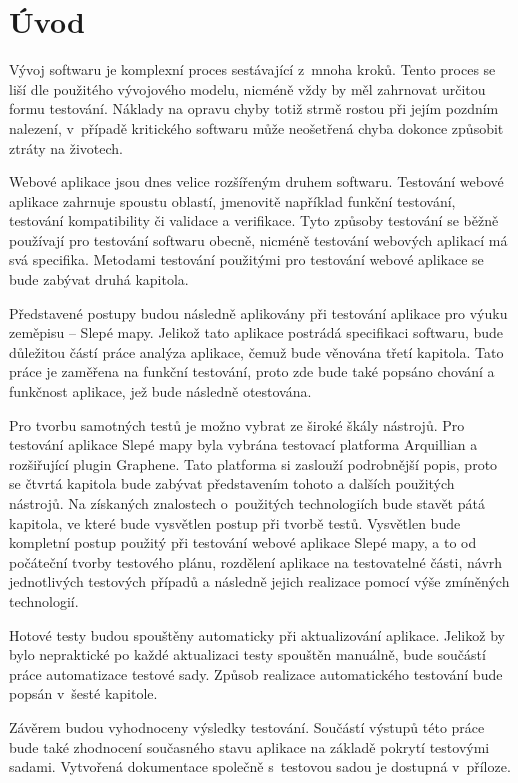 \documentclass[
    color,   %
	table,   %
    twoside, %
]{fithesis3}
\begin{document}
\lstset{language=Java} 
\chapter{Úvod}
Vývoj softwaru je komplexní proces sestávající z~mnoha kroků. Tento proces se liší dle použitého vývojového modelu, nicméně vždy by měl zahrnovat určitou formu testování. Náklady na opravu chyby totiž strmě rostou při jejím pozdním nalezení, v~případě kritického softwaru může neošetřená chyba dokonce způsobit ztráty na životech.

Webové aplikace jsou dnes velice rozšířeným druhem softwaru. Testování webové aplikace zahrnuje spoustu oblastí, jmenovitě například funkční testování, testování kompatibility či validace a verifikace. Tyto způsoby testování se běžně používají pro testování softwaru obecně, nicméně testování webových aplikací má svá specifika. Metodami testování použitými pro testování webové aplikace se bude zabývat druhá kapitola.

Představené postupy budou následně aplikovány při testování aplikace pro výuku zeměpisu – Slepé mapy\cite{SlepeMapy}. Jelikož tato aplikace postrádá specifikaci softwaru, bude důležitou částí práce analýza aplikace, čemuž bude věnována třetí kapitola. Tato práce je zaměřena na funkční testování, proto zde bude také popsáno chování a funkčnost aplikace, jež bude následně otestována.

Pro tvorbu samotných testů je možno vybrat ze široké škály nástrojů. Pro testování aplikace Slepé mapy byla vybrána testovací platforma Arquillian a rozšiřující plugin Graphene. Tato platforma si zaslouží podrobnější popis, proto se čtvrtá kapitola bude zabývat představením tohoto a dalších použitých nástrojů.
Na získaných znalostech o~použitých technologiích bude stavět pátá kapitola, ve které bude vysvětlen postup při tvorbě testů. Vysvětlen bude kompletní postup použitý při testování webové aplikace Slepé mapy, a to od počáteční tvorby testového plánu, rozdělení aplikace na testovatelné části, návrh jednotlivých testových případů a následně jejich realizace pomocí výše zmíněných technologií.

Hotové testy budou spouštěny automaticky při aktualizování aplikace. Jelikož by bylo  nepraktické po každé aktualizaci testy spouštěn manuálně, bude součástí práce automatizace testové sady. Způsob realizace automatického testování bude popsán v~šesté kapitole.

Závěrem budou vyhodnoceny výsledky testování. Součástí výstupů této práce bude také zhodnocení současného stavu aplikace na základě pokrytí testovými sadami. Vytvořená dokumentace společně s~testovou sadou je dostupná v~příloze.
\end{document}
